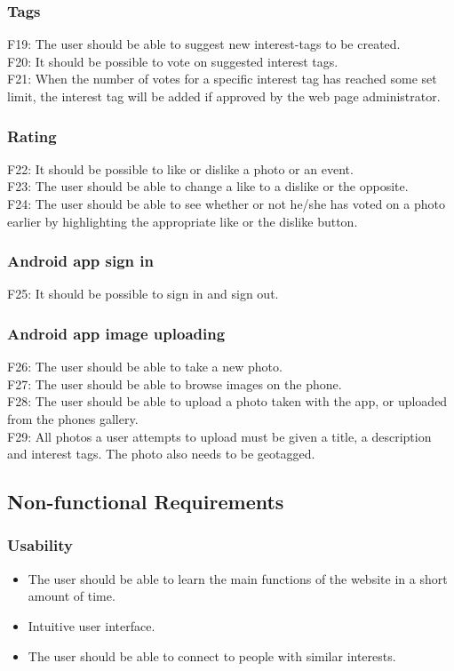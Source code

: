 \subsubsection{Tags}
F19: The user should be able to suggest new interest-tags to be created.\\
F20: It should be possible to vote on suggested interest tags.\\
F21: When the number of votes for a specific interest tag has reached some set limit, the interest tag will be added if approved by the web page administrator.

\subsubsection{Rating}
F22: It should be possible to like or dislike a photo or an event.\\
F23: The user should be able to change a like to a dislike or the opposite.\\
F24: The user should be able to see whether or not he/she has voted on a photo earlier by highlighting the appropriate like or the dislike button.

\subsubsection{Android app sign in}
F25: It should be possible to sign in and sign out.

\subsubsection{Android app image uploading}
F26: The user should be able to take a new photo. \\
F27: The user should be able to browse images on the phone. \\
F28: The user should be able to upload a photo taken with the app, or uploaded from the phones gallery. \\
F29: All photos a user attempts to upload must be given a title, a description and interest tags. The photo also needs to be geotagged.


\subsection{Non-functional Requirements}
\label{subsec:SysReqReqsNonFunc}

\subsubsection{Usability}
\begin{itemize}
    \item The user should be able to learn the main functions of the website in a short amount of time.
    \item Intuitive user interface.
    \item The user should be able to connect to people with similar interests.
\end{itemize}

